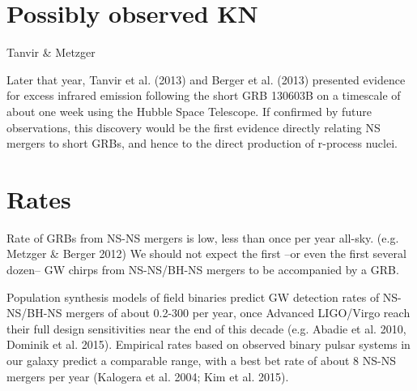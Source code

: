 \section{Possibly observed KN}

Tanvir \& Metzger

Later that year, Tanvir et al. (2013) and Berger et al. (2013) presented evidence for excess infrared emission following the short GRB 130603B on a timescale of about one week using the Hubble Space Telescope. If confirmed by future observations, this discovery would be the first evidence directly relating NS mergers to short GRBs, and hence to the direct production of r-process nuclei.

\section{Rates}

Rate of GRBs from NS-NS mergers is low, less than once per year all-sky. (e.g. Metzger \& Berger 2012)
We should not expect the first --or even the first several dozen-- GW chirps from NS-NS/BH-NS mergers to be accompanied by a GRB.


Population synthesis models of field binaries predict GW detection rates of NS-NS/BH-NS mergers of about 0.2-300 per year, once Advanced LIGO/Virgo reach their full design sensitivities near the end of this decade (e.g. Abadie et al. 2010, Dominik et al. 2015).
Empirical rates based on observed binary pulsar systems in our galaxy predict a comparable range, with a best bet rate of about 8 NS-NS mergers per year (Kalogera et al. 2004; Kim et al. 2015).

